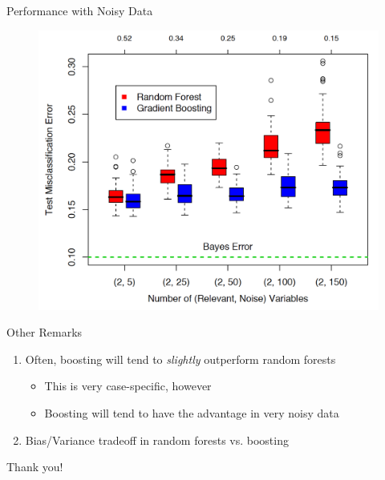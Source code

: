 \documentclass[pdf]{beamer}
\begin{document}
		
		\begin{frame}{Performance with Noisy Data}
			\begin{figure}
				\includegraphics[scale = 0.1]{test_error.png}
			\end{figure}		
    		\end{frame}

				
		\begin{frame}{Other Remarks}
			\begin{enumerate}
				
				\item Often, boosting will tend to \textit{slightly} outperform random forests
					\begin{itemize}
						\item This is very case-specific, however
						\item Boosting will tend to have the advantage in very noisy data
					\end{itemize}
				\item Bias/Variance tradeoff in random forests vs. boosting
				
				
			\end{enumerate}
		\end{frame}
		
	\begin{frame}{\hspace{3 mm}}
		\begin{center}
			Thank you!
		\end{center}
	\end{frame} 
		
		
		
\end{document}
